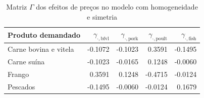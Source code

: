 
\begin{table}[H]
\centering
\caption{Matriz $\Gamma$ dos efeitos de preços no modelo com homogeneidade e simetria}
\label{tab:gamma-hsym-dup}
\small
\begin{tabular}{@{}lrrrr@{}}
\toprule
Produto demandado & $\gamma_{\cdot,\text{bfvl}}$ & $\gamma_{\cdot,\text{pork}}$ & $\gamma_{\cdot,\text{poult}}$ & $\gamma_{\cdot,\text{fish}}$ \\
\midrule
Carne bovina e vitela & -0.1072 & -0.1023 & 0.3591 & -0.1495 \\
Carne suína & -0.1023 & -0.0165 & 0.1248 & -0.0060 \\
Frango & 0.3591 & 0.1248 & -0.4715 & -0.0124 \\
Pescados & -0.1495 & -0.0060 & -0.0124 & 0.1679 \\
\bottomrule
\end{tabular}
\end{table}
